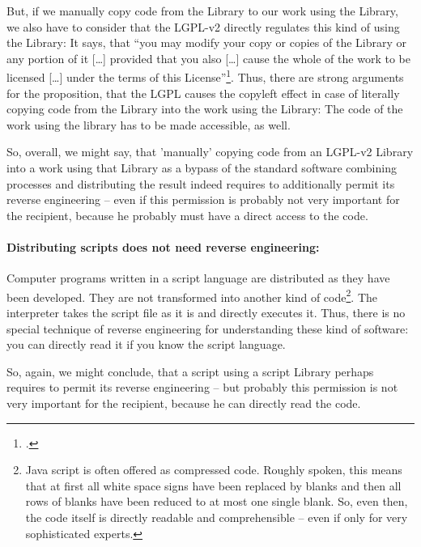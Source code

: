 But, if we manually copy code from the Library to our work using the Library, we
also have to consider that the LGPL-v2 directly regulates this kind of using
the Library: It says, that \enquote{you may modify your copy or copies of the
Library or any portion of it [\ldots] provided that you also [\ldots] cause the
whole of the work to be licensed [\ldots] under the terms of this
License}\footcite[cf.][\nopage wp., §2, escpcially §2c]{Lgpl21OsiLicense1999a}.
Thus, there are strong arguments for the proposition, that the LGPL causes the
copyleft effect in case of literally copying code from the Library into the work
using the Library: The code of the work using the library has to be made
accessible, as well.

So, overall, we might say, that 'manually' copying code from an LGPL-v2 Library
into a work using that Library as a bypass of the standard software combining
processes and distributing the result indeed requires to additionally permit its
reverse engineering -- even if this permission is probably not very important
for the recipient, because he probably must have a direct access to the code.

\paragraph{Distributing scripts does not need reverse engineering:}
\label{RevEngDistributeScripts}
Computer programs written in a script language are distributed as they have been
developed. They are not transformed into another kind of code\footnote{Java
script is often offered as compressed code. Roughly spoken, this means that at
first all white space signs have been replaced by blanks and then all rows of
blanks have been reduced to at most one single blank. So, even then, the code
itself is directly readable and comprehensible -- even if only for very
sophisticated experts.}. The interpreter takes the script file as it is and
directly executes it. Thus, there is no special technique of reverse engineering
for understanding these kind of software: you can directly read it if you know
the script language.

So, again, we might conclude, that a script using a script Library perhaps
requires to permit its reverse engineering -- but probably this permission is
not very important for the recipient, because he can directly read the code.

